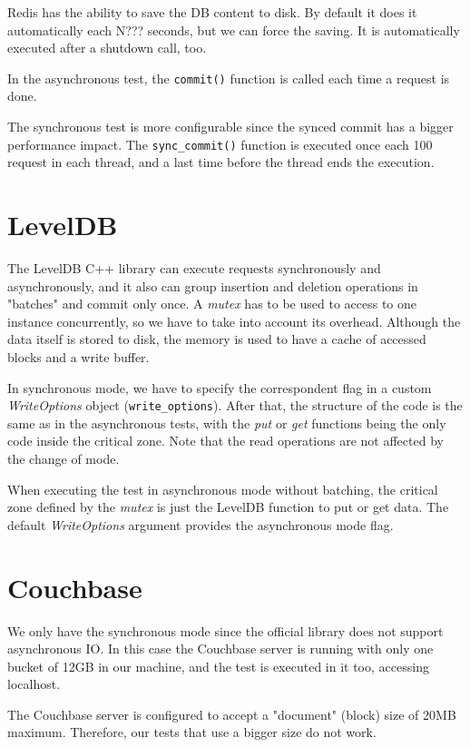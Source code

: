 \documentclass[11pt]{article}
\begin{document}
Redis has the ability to save the DB content to disk. By default it does it automatically each N??? seconds, but we can force the saving. It is automatically executed after a shutdown call, too.

In the asynchronous test, the \texttt{commit()} function is called each time a request is done.

The synchronous test is more configurable since the synced commit has a bigger performance impact. The \texttt{sync\_commit()} function is executed once each 100 request in each thread, and a last time before the thread ends the execution.

\section{LevelDB}
The LevelDB C++ library can execute requests synchronously and asynchronously, and it also can group insertion and deletion operations in "batches" and commit only once. A \textit{mutex} has to be used to access to one instance concurrently, so we have to take into account its overhead. Although the data itself is stored to disk, the memory is used to have a cache of accessed blocks and a write buffer.

In synchronous mode, we have to specify the correspondent flag in a custom \textit{WriteOptions} object (\texttt{write\_options}). After that, the structure of the code is the same as in the asynchronous tests, with the \textit{put} or \textit{get} functions being the only code inside the critical zone. Note that the read operations are not affected by the change of mode.

When executing the test in asynchronous mode without batching, the critical zone defined by the \textit{mutex} is just the LevelDB function to put or get data. The default \textit{WriteOptions} argument provides the asynchronous mode flag.

\section{Couchbase}
We only have the synchronous mode since the official library does not support asynchronous IO. In this case the Couchbase server is running with only one bucket of 12GB in our machine, and the test is executed in it too, accessing localhost.

The Couchbase server is configured to accept a "document" (block) size of 20MB maximum. Therefore, our tests that use a bigger size do not work.
\end{document}
